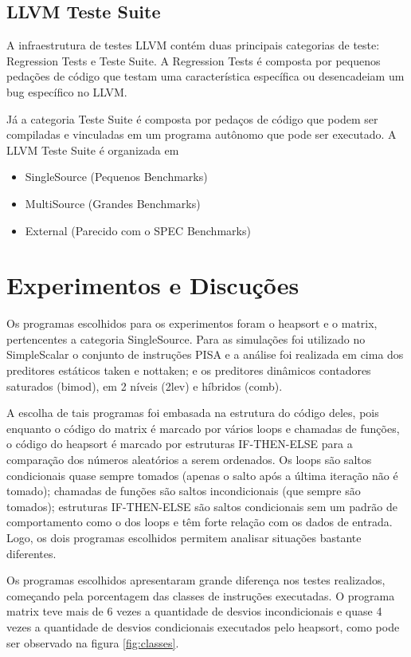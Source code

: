 \documentclass[12pt]{article}
\begin{document}
\subsection{LLVM Teste Suite}

A infraestrutura de testes LLVM contém duas principais categorias de teste: Regression Tests e Teste Suite. A Regression Tests é composta por pequenos pedações de código que testam uma característica específica ou desencadeiam um bug específico no LLVM.

Já a categoria Teste Suite é composta por pedaços de código que podem ser compiladas e vinculadas em um programa autônomo que pode ser executado. A LLVM Teste Suite é organizada em

\begin{itemize}
	\item SingleSource (Pequenos Benchmarks)
	\item MultiSource (Grandes Benchmarks)
	\item External (Parecido com o SPEC Benchmarks)
\end{itemize}

\section{Experimentos e Discuções}

Os programas escolhidos para os experimentos foram o heapsort e o matrix, pertencentes a categoria SingleSource. Para as simulações foi utilizado no SimpleScalar o conjunto de instruções PISA e a análise foi realizada em cima dos preditores estáticos taken e nottaken; e os preditores dinâmicos contadores saturados (bimod), em 2 níveis (2lev) e híbridos (comb).

A escolha de tais programas foi embasada na estrutura do código deles, pois enquanto o código do matrix é marcado por vários loops e chamadas de funções, o
código do heapsort é marcado por estruturas IF-THEN-ELSE para a comparação dos números aleatórios a serem ordenados. Os loops são saltos condicionais quase
sempre tomados (apenas o salto após a última iteração não é tomado); chamadas de funções são saltos incondicionais (que sempre são tomados); estruturas IF-THEN-ELSE são saltos condicionais sem um padrão de comportamento como o dos loops e têm forte relação com os dados de entrada. Logo, os dois programas escolhidos
permitem analisar situações bastante diferentes.

Os programas escolhidos apresentaram grande diferença nos testes realizados, começando pela porcentagem das classes de instruções executadas.
O programa matrix teve mais de 6 vezes a quantidade de desvios incondicionais e quase 4 vezes a quantidade de desvios condicionais executados pelo heapsort,  como pode ser observado na figura \ref{fig:classes}.
\end{document}
